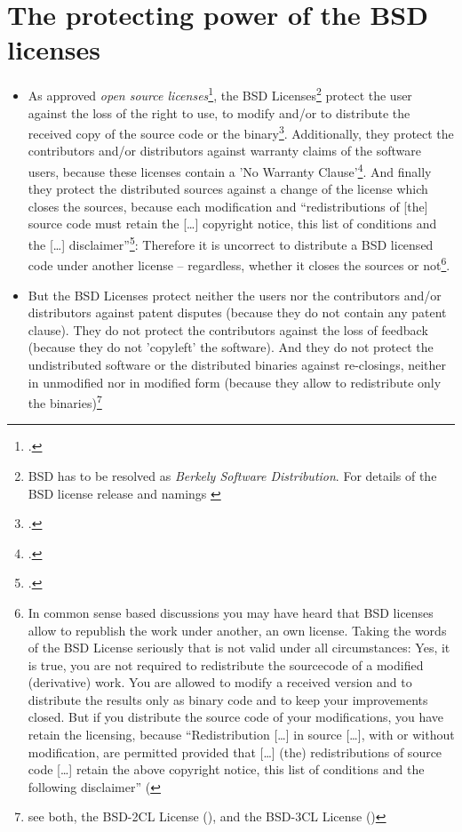 \section{The protecting power of the BSD licenses}
\begin{itemize}
  \item As approved \emph{open source licenses}\footcite[cf.][\nopage
  wp]{OSI2012b}, the BSD Licenses\footnote{BSD has to be resolved as
  \emph{Berkely Software Distribution}. For details of the BSD license release
  and namings \cite[cf.][\nopage wp.\ editorial]{BsdLicense3Clause}} protect the
  user against the loss of the right to use, to modify and/or to distribute the
  received copy of the source code or the binary\footcite[cf.][\nopage wp
  §1ff]{OSI2012a}. Additionally, they protect the contributors and/or
  distributors against warranty claims of the software users, because these
  licenses contain a 'No Warranty Clause'\footcite[one for all version
  cf.][\nopage wp]{BsdLicense2Clause}. And finally they protect the distributed
  sources against a change of the license which closes the sources, because each
  modification and \enquote{redistributions of [the] source code must retain the
  [\ldots] copyright notice, this list of conditions and the [\ldots]
  disclaimer}\footcite[cf.][\nopage wp]{BsdLicense2Clause}: Therefore it is
  uncorrect to distribute a BSD licensed code under another license -- regardless,
  whether it closes the sources or not\footnote{In common sense based discussions
  you may have heard that BSD licenses allow to republish the work under
  another, an own license. Taking the words of the BSD License seriously that is
  not valid under all circumstances: Yes, it is true, you are not required to 
  redistribute the sourcecode of a modified (derivative) work. You are allowed 
  to modify a received version and to distribute the results only as binary code 
  and to keep your improvements closed. But if you distribute the source code of 
  your modifications, you have retain the licensing, because 
  \enquote{Redistribution [\ldots] in source [\ldots], with or without 
  modification, are permitted provided that [\ldots] (the) redistributions of 
  source code [\ldots] retain the above copyright notice, this list of 
  conditions and the following disclaimer} 
  (\cite[cf.][\nopage wp]{BsdLicense2Clause}}.
  
  \item But the BSD Licenses protect neither the users nor the contributors
  and/or distributors against patent disputes (because they do not contain any
  patent clause). They do not protect the contributors against the loss of
  feedback (because they do not 'copyleft' the software). And they do not
  protect the undistributed software or the distributed binaries against
  re-closings, neither in unmodified nor in modified form (because they allow to
  redistribute only the binaries)\footnote{see both, the BSD-2CL License
  (\cite[cf.][\nopage wp]{BsdLicense2Clause}), and the BSD-3CL License
  (\cite[cf.][\nopage wp]{BsdLicense3Clause})}
  
\end{itemize}

